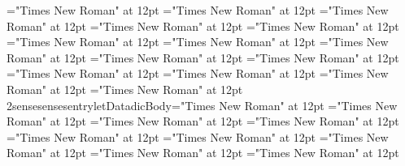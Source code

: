 \documentclass{article}
\begin{document}
 
\thispagestyle{empty} 
\font\xsensenumberLbsensesensesentryletDatadicBody="Times New Roman" at 12pt
\font\xlanguagetagxitemrelationantonymsensesensesentryletDatadicBody="Times New Roman" at 12pt
\font\xitemrelationantonymsensesensesentryletDatadicBody="Times New Roman" at 12pt
\font\relationantonymbeforesensesensesentryletDatadicBody="Times New Roman" at 12pt
\font\relationantonymsensesensesentryletDatadicBody="Times New Roman" at 12pt
\font\slotnameslotsgrammaticalinfosensesensesentryletDatadicBody="Times New Roman" at 12pt
\font\xlanguagetagxitemdefinitionLbsensesensesentryletDatadicBody="Times New Roman" at 12pt
\font\xitemdefinitionLbsensesensesentryletDatadicBody="Times New Roman" at 12pt
\font{}="Times New Roman" at 12pt
\font\slotnamexitemslotsgrammaticalinfosensesensesentryletDatadicBody="Times New Roman" at 12pt
\font\xitemslotsgrammaticalinfosensesensesentryletDatadicBody="Times New Roman" at 12pt
\font\slotsgrammaticalinfosensesensesentryletDatadicBody="Times New Roman" at 12pt
\font\partofspeechgrammaticalinfosensesensesentryletDatadicBody="Times New Roman" at 12pt
\font\grammaticalinfosensesensesentryletDatadicBody="Times New Roman" at 12pt
\font\xsensenumberL2sensesensesentryletDatadicBody="Times New Roman" at 12pt
\font\sensesensesentryletDatadicBody="Times New Roman" at 12pt
\font\sensesentryletDatadicBody="Times New Roman" at 12pt
\font\xhomographnumberheadwordentryletDatadicBody="Times New Roman" at 12pt
\font\headwordentryletDatadicBody="Times New Roman" at 12pt
\font\entryletDatadicBody="Times New Roman" at 12pt
\font{}="Times New Roman" at 12pt
\font{}="Times New Roman" at 12pt
\font{}="Times New Roman" at 12pt

\end{document}
